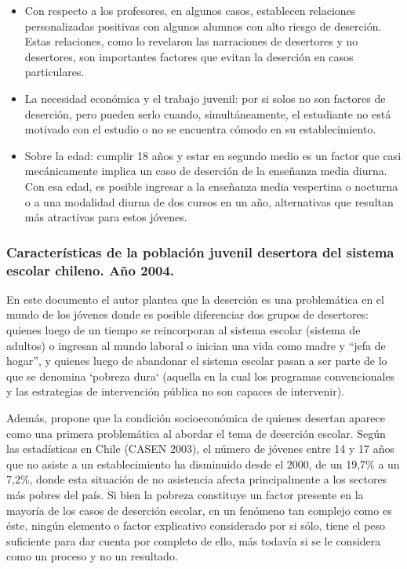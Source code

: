 \begin{itemize}
\item Con respecto a los profesores, en algunos casos, establecen relaciones personalizadas positivas con algunos alumnos con alto riesgo de deserción. Estas relaciones, como lo revelaron las narraciones de desertores y no desertores, son importantes factores que evitan la deserción en casos particulares.
\item La necesidad económica y el trabajo juvenil: por si solos no son factores de deserción, pero pueden serlo cuando, simultáneamente, el estudiante no está motivado con el estudio o no se encuentra cómodo en su establecimiento. 
\item Sobre la edad: cumplir 18 años y estar en segundo medio es un factor que casi mecánicamente implica un caso de deserción de la enseñanza media diurna. Con esa edad, es posible ingresar a la enseñanza media vespertina o nocturna o a una modalidad diurna de dos cursos en un año, alternativas que resultan más atractivas para estos jóvenes.
\end{itemize}

\subsubsection{Características de la población juvenil desertora del sistema escolar chileno. Año 2004.}
En este documento el autor plantea que la deserción es una problemática en el mundo de los jóvenes donde es posible diferenciar dos grupos de desertores: quienes luego de un tiempo se reincorporan al sistema escolar (sistema de adultos) o ingresan al mundo laboral o inician una vida  como madre y “jefa de hogar”, y quienes luego de abandonar el sistema escolar pasan a ser parte de lo que se denomina ‘pobreza dura` (aquella en la cual los programas convencionales y las estrategias de intervención pública no son capaces de intervenir).

Además, propone que la condición socioeconómica de quienes desertan aparece como una primera problemática al abordar el tema de deserción escolar. Según las estadísticas en Chile (CASEN 2003), el número de jóvenes entre 14 y 17 años que no asiste a un establecimiento ha disminuido desde el 2000, de un 19,7\% a un 7,2\%, donde esta situación de no asistencia afecta principalmente a los sectores más pobres del país. Si bien la pobreza constituye un factor presente en la mayoría de los casos de deserción escolar, en un fenómeno tan complejo como es éste, ningún elemento o factor explicativo considerado por si sólo, tiene el peso suficiente para dar cuenta por completo de ello, más todavía si se le considera como un proceso y no un resultado.  

